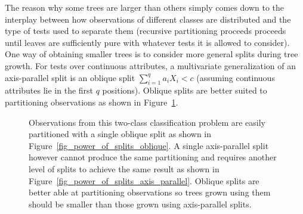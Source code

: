 The reason why some trees are larger than others simply comes down to the interplay between how observations of different classes are distributed and the type of tests used to separate them (recursive partitioning proceeds proceeds until leaves are sufficiently pure with whatever tests it is allowed to consider). One way of obtaining smaller trees is to consider more general splits during tree growth. For tests over continuous attributes, a multivariate generalization of an axis-parallel split is an oblique split $\sum_{i=1}^q a_iX_i<c$ (assuming continuous attributes lie in the first $q$ positions). Oblique splits are better suited to partitioning observations as shown in Figure~\ref{fig_power_of_splits}.\\
\begin{figure}
\centering
{}
\caption{Observations from this two-class classification problem are easily partitioned with a single oblique split as shown in Figure~\ref{fig_power_of_splits_oblique}. A single axis-parallel split however cannot produce the same partitioning and requires another level of splits to achieve the same result as shown in Figure~\ref{fig_power_of_splits_axis_parallel}. Oblique splits are better able at partitioning observations so trees grown using them should be smaller than those grown using axis-parallel splits.}
\label{fig_power_of_splits}
\end{figure}

